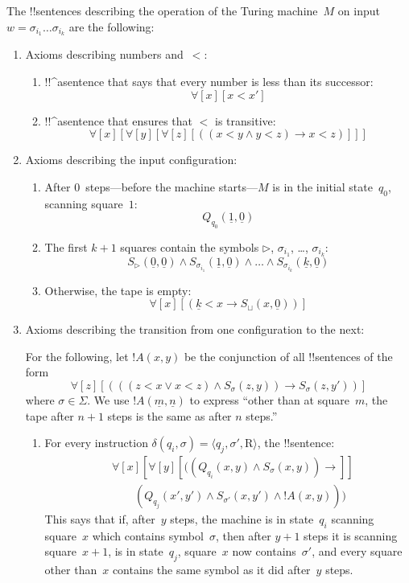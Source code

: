 \documentclass[10pt,a4paper]{article}
\theoremstyle{plain}
\theoremstyle{definition}
\theoremstyle{remark}
\newcommand*{\ollabel}[1]{\label{#1}}
\providecommand{\lif}{\mathbin{\rightarrow}}
\providecommand{\lforall}{\mathord{\forall}}
\providecommand{\Obj}{}
\providecommand{\tuple}[1]{\langle #1 \rangle}
\providecommand{\num}[1]{\underline{#1}}
\providecommand{\TMblank}{\sqcup}
\providecommand{\TMright}{\mathrm{R}}
\providecommand{\TMendtape}{\triangleright}
\begin{document}
The !!{sentence}s describing the operation of the Turing machine~$M$ on
input $w = \sigma_{i_1}\dots\sigma_{i_k}$ are the following:
\begin{enumerate}
\item Axioms describing numbers and~$<$:
\begin{enumerate}
\item !!^a{sentence} that says that every number is less than its successor:
\[
\lforall[x][x < x']
\]
\item !!^a{sentence} that ensures that $<$ is transitive:
\[
\lforall[x][\lforall[y][\lforall[z][
      ((x < y \land y < z) \lif x < z)]]]
\]
\end{enumerate}
\item Axioms describing the input configuration:
\begin{enumerate}
\item After $0$~steps---before the machine starts---$M$ is in
  the initial state~$q_0$, scanning square~$1$:
\[
\Obj Q_{q_0}(\num{1}, \num{0})
\]
\item The first $k+1$ squares contain the symbols $\TMendtape$,
  $\sigma_{i_1}$, \dots, $\sigma_{i_k}$:
\[
\Obj S_\TMendtape(\num{0}, \num{0}) \land
\Obj S_{\sigma_{i_1}}(\num{1}, \num{0}) \land
\dots \land
\Obj S_{\sigma_{i_k}}(\num{k}, \num{0})
\]
\item Otherwise, the tape is empty:
\[
\lforall[x][(\num{k} < x \lif \Obj S_\TMblank(x, \num{0}))]
\]
\end{enumerate}
\item Axioms describing the transition from one configuration to
  the next:

For the following, let $!A(x, y)$ be the conjunction of all !!{sentence}s
of the form
\[
\lforall[z][
  (((z < x \lor x < z) \land \Obj S_\sigma(z, y))
  \lif \Obj S_\sigma(z, y'))]
\]
where $\sigma \in \Sigma$.  We use $!A(\num{m},\num{n})$ to express
``other than at square~$m$, the tape after $n+1$ steps is the same as
after $n$ steps.''
\begin{enumerate}
\item \ollabel{rep-right} For every instruction $\delta(q_i, \sigma) =
  \tuple{q_j, \sigma', \TMright}$, the !!{sentence}:
\begin{align*}
& \lforall[x][\lforall[y][(
   (\Obj Q_{q_i}(x, y) \land \Obj S_{\sigma}(x, y)) \lif {}]] \\
&\qquad   (\Obj Q_{q_j}(x', y') \land \Obj S_{\sigma'}(x, y') \land
!A(x, y)))
\end{align*}
This says that if, after~$y$ steps, the machine is in state~$q_i$
scanning square~$x$ which contains symbol~$\sigma$, then after $y+1$
steps it is scanning square~$x+1$, is in state~$q_j$, square~$x$ now
contains~$\sigma'$, and every square other than~$x$ contains the
same symbol as it did after~$y$ steps.


\end{enumerate}
\end{enumerate}
\end{document}
